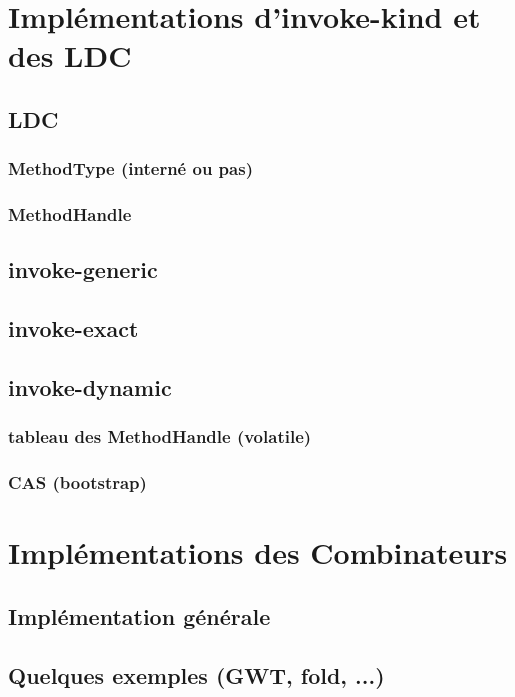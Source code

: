 \documentclass{sigplanconf}
\begin{document}
\section{Impl\'ementations d'invoke-kind et des LDC}

  \subsection{LDC}

    \subsubsection{MethodType (intern\'e ou pas)}
    \subsubsection{MethodHandle}

  \subsection{invoke-generic}
  \subsection{invoke-exact}
  \subsection{invoke-dynamic}

    \subsubsection{tableau des MethodHandle (volatile)}
    \subsubsection{CAS (bootstrap)}

\section{Impl\'ementations des Combinateurs}

  \subsection{Impl\'ementation g\'en\'erale}
  \subsection{Quelques exemples (GWT, fold, ...)}
\end{document}
